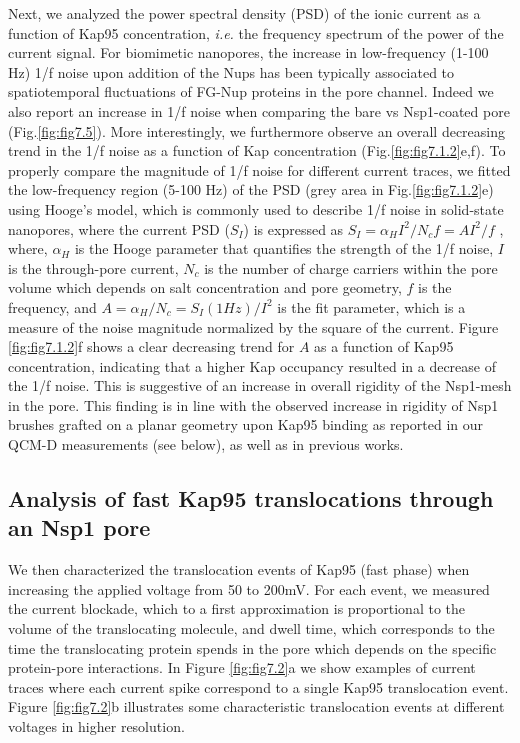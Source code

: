 Next, we analyzed the power spectral density (PSD) of the ionic current as a function of Kap95 concentration, \emph{i.e.} the frequency spectrum of the power of the current signal. For biomimetic nanopores, the increase in low-frequency (1-100 Hz) 1/f noise upon addition of the Nups has been typically associated to spatiotemporal fluctuations of FG-Nup proteins in the pore channel\cite{Kowalczyk2011a,Ananth2018,Fragasso2021}.  Indeed we also report an increase in 1/f noise when comparing the bare vs Nsp1-coated pore (Fig.\ref{fig:fig7.5}). More interestingly, we furthermore observe an overall decreasing trend in the 1/f noise as a function of Kap concentration (Fig.\ref{fig:fig7.1.2}e,f). To properly compare the magnitude of 1/f noise for different current traces, we fitted the low-frequency region (5-100 Hz) of the PSD (grey area in Fig.\ref{fig:fig7.1.2}e) using Hooge’s model\cite{Hooge1976}, which is commonly used to describe 1/f noise in solid-state nanopores\cite{Smeets2009,Smeets2008,Fragasso2019,Fragasso2020}, where the current PSD ($S_I$) is expressed as  $S_I=\alpha_H I^2/N_c f=AI^2/f$ , where,  $\alpha_H$ is the Hooge parameter that quantifies the strength of the 1/f noise, $I$ is the through-pore current, $N_c$ is the number of charge carriers within the pore volume which depends on salt concentration and pore geometry, $f$ is the frequency, and $A=\alpha_H/N_c=S_I (1Hz)/I^2$ is the fit parameter, which is a measure of the noise magnitude normalized by the square of the current. Figure \ref{fig:fig7.1.2}f shows a clear decreasing trend for $A$ as a function of Kap95 concentration, indicating that a higher Kap occupancy resulted in a decrease of the 1/f noise. This is suggestive of an increase in overall rigidity of the Nsp1-mesh in the pore. This finding is in line with the observed increase in rigidity of Nsp1 brushes grafted on a planar geometry upon Kap95 binding as reported in our QCM-D measurements (see below), as well as in previous works\cite{Eisele2010a,Wagner2015}.


\subsection{Analysis of fast Kap95 translocations through an Nsp1 pore }
We then characterized the translocation events of Kap95 (fast phase) when increasing the applied voltage from 50 to 200mV. For each event, we measured the current blockade, which to a first approximation is proportional to the volume of the translocating molecule, and dwell time, which corresponds to the time the translocating protein spends in the pore which depends on the specific protein-pore interactions. In Figure \ref{fig:fig7.2}a we show examples of current traces where each current spike correspond to a single Kap95 translocation event. Figure \ref{fig:fig7.2}b illustrates some characteristic translocation events at different voltages in higher resolution.

